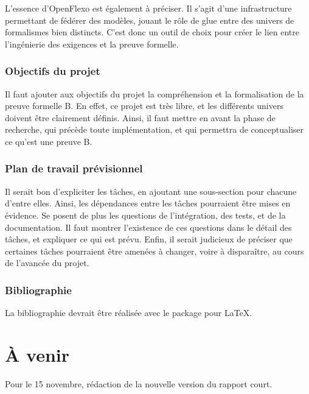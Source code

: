 \documentclass{article}
\begin{document}
L'essence d'OpenFlexo est également à préciser.
Il s'agit d'une infrastructure permettant de fédérer des modèles, jouant le rôle de glue entre des univers de formalismes bien distincts.
C'est donc un outil de choix pour créer le lien entre l'ingénierie des exigences et la preuve formelle.

\subsubsection*{Objectifs du projet}

Il faut ajouter aux objectifs du projet la compréhension et la formalisation de la preuve formelle B.
En effet, ce projet est très libre, et les différents univers doivent être clairement définis.
Ainsi, il faut mettre en avant la phase de recherche, qui précède toute implémentation, et qui permettra de conceptualiser ce qu'est une preuve B.

\subsubsection*{Plan de travail prévisionnel}

Il serait bon d'expliciter les tâches, en ajoutant une sous-section pour chacune d'entre elles.
Ainsi, les dépendances entre les tâches pourraient être mises en évidence.
Se posent de plus les questions de l'intégration, des tests, et de la documentation.
Il faut montrer l'existence de ces questions dans le détail des tâches, et expliquer ce qui est prévu.
Enfin, il serait judicieux de préciser que certaines tâches pourraient être amenées à changer, voire à disparaître, au cours de l'avancée du projet.

\subsubsection*{Bibliographie}

La bibliographie devrait être réalisée avec le package  pour \LaTeX.

\section*{À venir}

Pour le 15 novembre, rédaction de la nouvelle version du rapport court.
\end{document}
